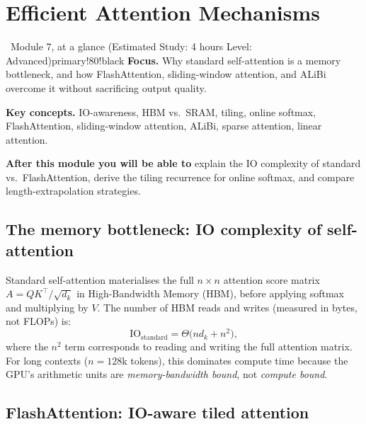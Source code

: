 \documentclass[11pt,a4paper]{article}
\begin{document}
	\clearpage
	\section{Efficient Attention Mechanisms}
	\label{sec:efficient-attention}

	\begin{modulecard}{\faMemory\ Module 7, at a glance \hfill \small\normalfont (Estimated Study: 4 hours \textbullet{} Level: Advanced)}{primary!80!black}
		\textbf{Focus.} Why standard self-attention is a memory bottleneck, and how FlashAttention, sliding-window attention, and ALiBi overcome it without sacrificing output quality.

		\medskip
		\textbf{Key concepts.} IO-awareness, HBM vs.\ SRAM, tiling, online softmax, FlashAttention, sliding-window attention, ALiBi, sparse attention, linear attention.

		\medskip
		\textbf{After this module you will be able to} explain the IO complexity of standard vs.\ FlashAttention, derive the tiling recurrence for online softmax, and compare length-extrapolation strategies.
	\end{modulecard}

	\subsection{The memory bottleneck: IO complexity of self-attention}

	Standard self-attention materialises the full $n \times n$ attention score matrix $A = QK^\top / \sqrt{d_k}$ in High-Bandwidth Memory (HBM), before applying softmax and multiplying by $V$. The number of HBM reads and writes (measured in bytes, not FLOPs) is:
	\begin{equation}
		\mathrm{IO}_{\mathrm{standard}} = \Theta\!\bigl(n d_k + n^2\bigr),
	\end{equation}
	where the $n^2$ term corresponds to reading and writing the full attention matrix. For long contexts ($n = 128$k tokens), this dominates compute time because the GPU's arithmetic units are \emph{memory-bandwidth bound}, not \emph{compute bound}.

	\subsection{FlashAttention: IO-aware tiled attention}
\end{document}
